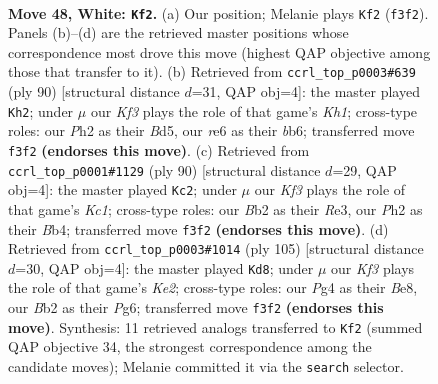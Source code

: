 \documentclass[11pt]{article}
\begin{document}
\clearpage

\begin{figure}[p]\centering
\begin{subfigure}{0.46\textwidth}\centering
\resizebox{\linewidth}{!}{%
\newchessgame
\chessboard[
  setfen={6k1/3n4/4r3/8/p1p3P1/P1P2K1p/1BP4P/1R6 w - - 1 48},
  showmover=false,
  pgfstyle=straightmove, color=movearrow, markmove={f3-f2}
]}
\caption{}
\end{subfigure}\hfill
\begin{subfigure}{0.46\textwidth}\centering
\resizebox{\linewidth}{!}{%
\newchessgame
\chessboard[
  setfen={8/4k1p1/1b5p/p2B1p1P/P7/1P6/6P1/7K w - - 1 46},
  showmover=false,
  pgfstyle=straightmove, color=movearrow, markmove={h1-h2}
]}
\caption{}
\end{subfigure}
\\[4pt]
\begin{subfigure}{0.46\textwidth}\centering
\resizebox{\linewidth}{!}{%
\newchessgame
\chessboard[
  setfen={3r4/5k1p/p7/1p6/1B4bP/P2PR3/1P6/2K5 w - - 5 46},
  showmover=false,
  pgfstyle=straightmove, color=movearrow, markmove={c1-c2}
]}
\caption{}
\end{subfigure}\hfill
\begin{subfigure}{0.46\textwidth}\centering
\resizebox{\linewidth}{!}{%
\newchessgame
\chessboard[
  setfen={4b3/4k3/2p2pp1/2P4p/1PB4P/4K1P1/8/8 b - - 20 53},
  showmover=false,
  pgfstyle=straightmove, color=movearrow, markmove={e7-d8}
]}
\caption{}
\end{subfigure}
\caption{\textbf{Move 48, White: \texttt{Kf2}.} (a) Our position; Melanie plays \texttt{Kf2} (\texttt{f3f2}). Panels (b)--(d) are the retrieved master positions whose correspondence most drove this move (highest QAP objective among those that transfer to it). (b) Retrieved from \texttt{ccrl\_top\_p0003\#639} (ply 90) [structural distance $d$=31, QAP obj=4]: the master played \texttt{Kh2}; under $\mu$ our \emph{Kf3} plays the role of that game's \emph{Kh1}; cross-type roles: our \emph{P}h2 as their \emph{B}d5, our \emph{r}e6 as their \emph{b}b6; transferred move \texttt{f3f2} \textbf{(endorses this move)}. (c) Retrieved from \texttt{ccrl\_top\_p0001\#1129} (ply 90) [structural distance $d$=29, QAP obj=4]: the master played \texttt{Kc2}; under $\mu$ our \emph{Kf3} plays the role of that game's \emph{Kc1}; cross-type roles: our \emph{B}b2 as their \emph{R}e3, our \emph{P}h2 as their \emph{B}b4; transferred move \texttt{f3f2} \textbf{(endorses this move)}. (d) Retrieved from \texttt{ccrl\_top\_p0003\#1014} (ply 105) [structural distance $d$=30, QAP obj=4]: the master played \texttt{Kd8}; under $\mu$ our \emph{Kf3} plays the role of that game's \emph{Ke2}; cross-type roles: our \emph{P}g4 as their \emph{B}e8, our \emph{B}b2 as their \emph{P}g6; transferred move \texttt{f3f2} \textbf{(endorses this move)}. Synthesis: 11 retrieved analogs transferred to \texttt{Kf2} (summed QAP objective 34, the strongest correspondence among the candidate moves); Melanie committed it via the \texttt{search} selector.}
\label{fig:thought-m94}
\end{figure}
\end{document}
